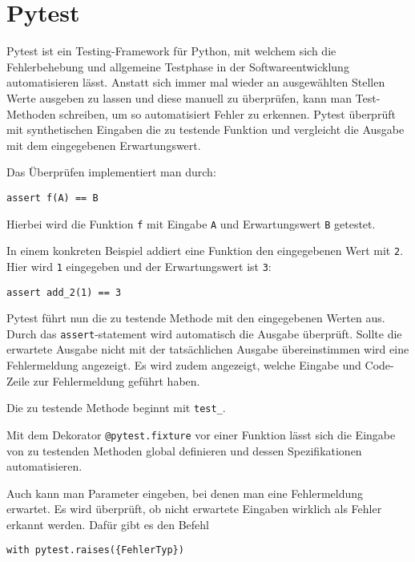 \section{Pytest}
Pytest ist ein Testing-Framework für Python, mit welchem sich die Fehlerbehebung und allgemeine Testphase in der Softwareentwicklung automatisieren lässt. Anstatt sich immer mal wieder an ausgewählten Stellen Werte ausgeben zu lassen und diese manuell zu überprüfen, kann man Test-Methoden schreiben, um so automatisiert Fehler zu erkennen. Pytest überprüft mit synthetischen Eingaben die zu testende Funktion und vergleicht die Ausgabe mit dem eingegebenen Erwartungswert.

Das Überprüfen implementiert man durch:

\begin{verbatim}
assert f(A) == B
\end{verbatim}

Hierbei wird die Funktion \texttt{f} mit Eingabe \texttt{A} und Erwartungswert \texttt{B} getestet. 

In einem konkreten Beispiel addiert eine Funktion den eingegebenen Wert mit \texttt{2}. Hier wird \texttt{1} eingegeben und der Erwartungswert ist \texttt{3}:

\begin{verbatim}
assert add_2(1) == 3
\end{verbatim}

Pytest führt nun die zu testende Methode mit den eingegebenen Werten aus. Durch das \texttt{assert}-statement wird automatisch die Ausgabe überprüft. Sollte die erwartete Ausgabe nicht mit der tatsächlichen Ausgabe übereinstimmen wird eine Fehlermeldung angezeigt. Es wird zudem angezeigt, welche Eingabe und Code-Zeile zur Fehlermeldung geführt haben.

Die zu testende Methode beginnt mit \texttt{test\_}.

Mit dem Dekorator \texttt{@pytest.fixture} vor einer Funktion lässt sich die Eingabe von zu testenden Methoden global definieren und dessen Spezifikationen automatisieren.

Auch kann man Parameter eingeben, bei denen man eine Fehlermeldung erwartet. Es wird überprüft, ob nicht erwartete Eingaben wirklich als Fehler erkannt werden. Dafür gibt es den Befehl

\begin{verbatim}
with pytest.raises({FehlerTyp})
\end{verbatim}

